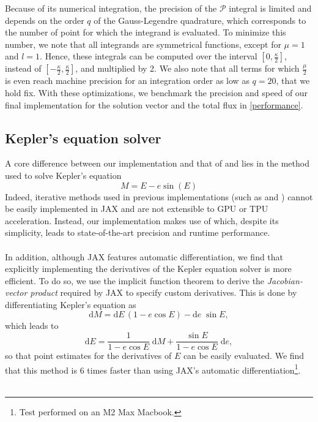 \documentclass[modern]{aastex631}
\begin{document}
Because of its numerical integration, the precision of the $\mathcal{P}$ integral is limited and depends on the order $q$ of the Gauss-Legendre quadrature, which corresponds to the number of point for which the integrand is evaluated. To minimize this number, we note that all integrands are symmetrical functions, except for $\mu=1$ and $l=1$. Hence, these integrals can be computed over the interval $\left[0, \frac{\kappa}{2}\right]$, instead of $\left[-\frac{\kappa}{2}, \frac{\kappa}{2}\right]$, and multiplied by 2. We also note that all terms for which $\frac{\mu}{2}$ is even reach machine precision for an integration order as low as $q=20$, that we hold fix. With these optimizations, we benchmark the precision and speed of our final implementation for the solution vector and the total flux in \autoref{performance}.

\subsection{Kepler's equation solver}
A core difference between our implementation and that of \cite{starry} and \cite{exoplanet} lies in the method used to solve Kepler's equation
\begin{equation}
    M = E - e \sin(E)
\end{equation}
Indeed, iterative methods used in previous implementations (such as \citealt{Raposo2017} and \citealt{Brandt2021}) cannot be easily implemented in \textsf{JAX} and are not extensible to GPU or TPU acceleration. Instead, our implementation makes use of \cite{Markley1995} which, despite its simplicity, leads to state-of-the-art precision and runtime performance.\\\\
In addition, although \textsf{JAX} features automatic differentiation, we find that explicitly implementing the derivatives of the Kepler equation solver is more efficient. To do so, we use the implicit function theorem to derive the \textit{Jacobian-vector product} required by \textsf{JAX} to specify custom derivatives. This is done by differentiating Kepler's equation as
\begin{equation}
    \mathrm{d}M = \mathrm{d}E\,(1 - e \cos E) - \mathrm{d}e\;\sin E,
\end{equation}
which leads to
\begin{equation}
\mathrm{d}E = \frac{1}{1 - e \cos E}\;\mathrm{d}M + \frac{\sin E}{1 - e \cos E}\;\mathrm{d}e,
\end{equation}
so that point estimates for the derivatives of $E$ can be easily evaluated. We find that this method is 6 times faster than using \textsf{JAX}'s automatic differentiation\footnote{Test performed on an M2 Max Macbook.}.\\\\
\end{document}
